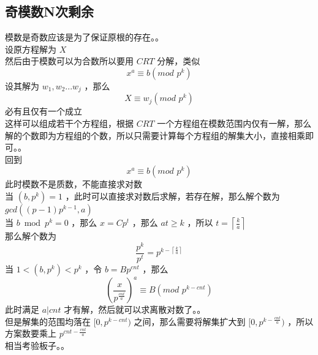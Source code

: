 	\subsection{奇模数N次剩余}
	模数是奇数应该是为了保证原根的存在。。\\
	设原方程解为 $X$\\
	然后由于模数可以为合数所以要用 $CRT$ 分解，类似\\
	$$
	x^a\equiv b(mod\,\,p^k)
	$$
	设其解为 $w_1,w_2...w_j$ ，那么
	$$
	X\equiv w_j(mod\,\,p^k)
	$$
	必有且仅有一个成立\\
	这样可以组成若干个方程组，根据 $CRT$  一个方程组在模数范围内仅有一解，那么解的个数即为方程组的个数，所以只需要计算每个方程组的解集大小，直接相乘即可。。\\
	回到
	$$
	x^a\equiv b(mod\,\,p^k)
	$$
	此时模数不是质数，不能直接求对数\\
	当 $(b,p^k)=1$ ，此时可以直接求对数后求解，若存在解，那么解个数为 $gcd((p-1)p^{k-1},a)$\\
	当 $b\bmod p^k=0$ ，那么 $x=Cp^t$ ，那么 $at\geq k$ ，所以 $t=\left\lceil \frac{k}{a} \right\rceil$\\
	那么解个数为
	$$
	\frac{p^k}{p^t}=p^{k-\left\lceil \frac{k}{a} \right\rceil}
	$$
	当 $1<(b,p^k)<p^k$ ，令 $b=Bp^{cnt}$ ，那么
	$$
	\left(\frac{x}{p^{\frac{cnt}{a} }}  \right)^a\equiv B(mod\,\,p^{k-cnt})
	$$
	此时满足 $a|cnt$ 才有解，然后就可以求离散对数了。。\\
	但是解集的范围均落在 $[0,p^{k-cnt})$ 之间，那么需要将解集扩大到 $[0,p^{k-\frac{cnt}{a}})$ ，所以方案数要乘上 $p^{cnt-\frac{cnt}{a}}$\\
	相当考验板子。。\\
	
%	
%